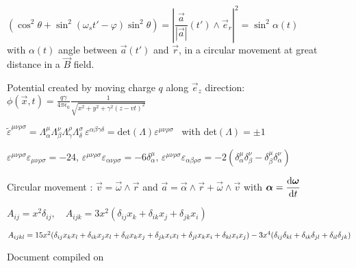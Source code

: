 \item $\left(\cos^2\theta + \sin^2(\omega_st' - \varphi)\sin^2\theta\right) = \left| \dfrac{\vec{a}}{|\vec{a}|}(t') \wedge \vec{e}_r \right|^2 =  \sin^2\alpha(t)$ \\
with $\alpha(t)$ angle between $\vec{a}(t')$ and $\vec{r}$, in a circular movement at great distance in a $\vec{B}$ field.%

\item Potential created by moving charge $q$ along $\vec{e}_z$ direction:\\
$\phi(\vec{x},t)=\frac{q\gamma}{4\pi\epsilon_0}\frac{1}{\sqrt{x^2+y^2+\gamma^2(z-vt)^2}}$


\item$\tilde{\varepsilon}^{\mu\nu\rho\sigma} = \Lambda^{\mu}_{\alpha}\Lambda^{\nu}_{\beta}\Lambda^{\rho}_{\gamma}\Lambda^{\sigma}_{\delta} \, \varepsilon^{\alpha\beta\gamma\delta} = \text{det}(\Lambda)\varepsilon^{\mu\nu\rho\sigma}$ \, with det$(\Lambda) = \pm 1$

\item$\varepsilon^{\mu\nu\rho\sigma}\varepsilon_{\mu\nu\rho\sigma} = -24, \, \varepsilon^{\mu\nu\rho\sigma}\varepsilon_{\alpha\nu\rho\sigma} = -6\delta^{\mu}_{\alpha}, \, \varepsilon^{\mu\nu\rho\sigma}\varepsilon_{\alpha\beta\rho\sigma} = -2(\delta^{\mu}_{\alpha}\delta^{\nu}_{\beta} - \delta^{\mu}_{\beta}\delta^{\nu}_{\alpha})$

\item Circular movement : $\vec{v} = \vec{\omega} \wedge \vec{r}$ and $\vec{a} = \vec{\alpha} \wedge \vec{r} + \vec{\omega} \wedge \vec{v}$ with $\mbox{\boldmath$\alpha$} = \dfrac{\textrm{d} \mbox{\boldmath$\omega$}}{\textrm{d} t}$

\item $A_{ij} = x^2 \delta_{ij}, \quad A_{ijk} = 3x^2(\delta_{ij}x_k + \delta_{ik}x_j + \delta_{jk}x_i)$

\item $A_{ijkl} = 15x^2(\delta_{ij}x_kx_l + \delta_{ik}x_jx_l + \delta_{il}x_kx_j + \delta_{jk}x_ix_l + \delta_{jl}x_kx_i + \delta_{kl}x_ix_j) -\\
3x^4(\delta_{ij}\delta_{kl} + \delta_{ik}\delta_{jl} + \delta_{il}\delta_{jk})$

\squishend
\begin{flushright}
Document compiled on \DTMnow
\end{flushright}